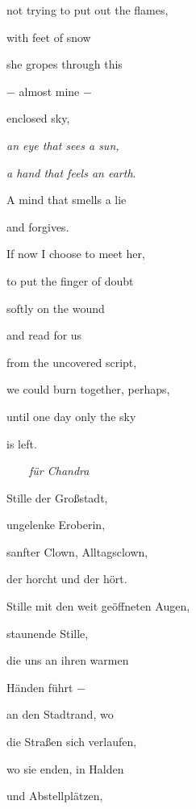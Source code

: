 \documentclass[a4paper]{article}
\begin{document}
not trying to put out the flames,

with feet of snow


\bigskip

she gropes through this

$-$ almost mine $-$

enclosed sky,


\bigskip

{\itshape
an eye that sees a sun,}

\textit{a hand that feels an earth}.

A mind that smells a lie


\bigskip

and forgives.

If now I choose to meet her,

to put the finger of doubt


\bigskip

softly on the wound

and read for us

from the uncovered script,


\bigskip

we could burn together, perhaps,

until one day only the sky 

is left.


\bigskip


\bigskip


\bigskip


\ \ \ \ \textit{für Chandra}


\bigskip

Stille der Großstadt,

ungelenke Eroberin,

sanfter Clown, Alltagsclown, 

der horcht und der hört.


\bigskip

Stille mit den weit geöffneten Augen,

staunende Stille,

die uns an ihren warmen

Händen führt $-$


\bigskip

an den Stadtrand, wo

die Straßen sich verlaufen,

wo sie enden, in Halden

und Abstellplätzen,
\end{document}
